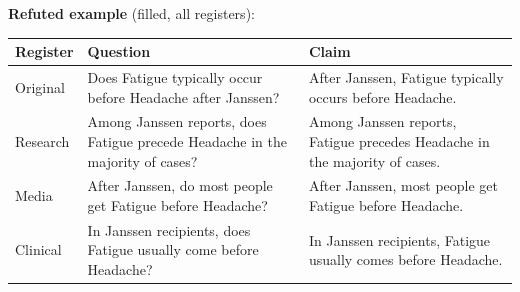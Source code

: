 \documentclass[11pt]{article}
\begin{document}
\vspace{3pt}
\textbf{Refuted example} (filled, all registers): \\
\begin{tabularx}{\linewidth}{@{}l L L@{}}
\toprule
\textbf{Register} & \textbf{Question} & \textbf{Claim} \\
\midrule
Original & Does Fatigue typically occur before Headache after Janssen? & After Janssen, Fatigue typically occurs before Headache. \\
Research & Among Janssen reports, does Fatigue precede Headache in the majority of cases? & Among Janssen reports, Fatigue precedes Headache in the majority of cases. \\
Media & After Janssen, do most people get Fatigue before Headache? & After Janssen, most people get Fatigue before Headache. \\
Clinical & In Janssen recipients, does Fatigue usually come before Headache? & In Janssen recipients, Fatigue usually comes before Headache. \\
\bottomrule
\end{tabularx}
\vspace{3pt}
\end{document}
